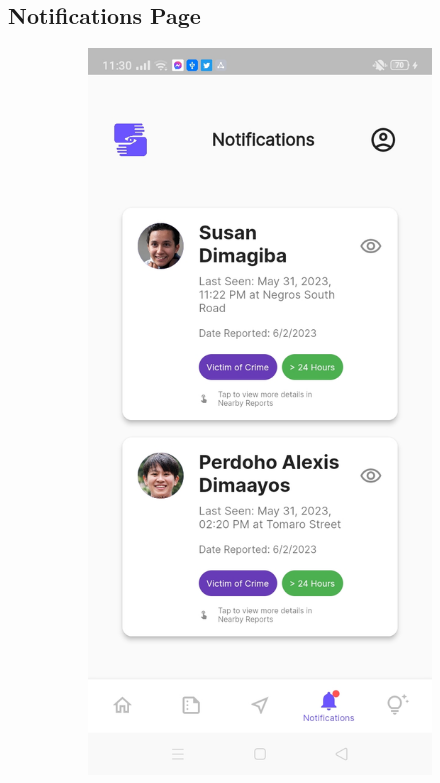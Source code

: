 \subsection{Notifications Page}

\begin{figure}[!h]
    \centering
    \begin{subfigure}[c]{0.30\linewidth}
        \centering
        \includegraphics[scale=0.15]{figures/Chapter4/Main/Notifications-1.jpg}

\end{subfigure}
\end{figure}
